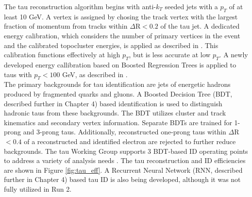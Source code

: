 The tau reconstruction algorithm begins with anti-$k_T$ seeded jets with a $p_T$ of at least 10 GeV. A vertex is assigned by chosing the track vertex with the largest fraction of momentum from tracks within $\Delta$R$<0.2$ of the tau jet. A dedicated energy calibration, which considers the number of primary vertices in the event and the calibrated topocluster energies, is applied as described in \cite{taus_run2}. This calibration functions effectively at high $p_T$, but is less accurate at low $p_T$. A newly developed energy callibration based on Boosted Regression Trees is applied to taus with $p_T<100$ GeV, as described in \cite{tau_particle_flow}.\\

The primary backgrounds for tau identification are jets of energetic hadrons produced by fragmented quarks and gluons. A Boosted Decision Tree (BDT, described further in Chapter 4) based identification is used to distinguish hadronic taus from these backgrounds. The BDT utilizes cluster and track kinematics and secondary vertex information. Separate BDTs are trained for 1-prong and 3-prong taus. Additionally, reconstructed one-prong taus within $\Delta$R$<0.4$ of a reconstructed and identified electron are rejected to further reduce backgrounds. The tau Working Group supports 3 BDT-based ID operating points to address a variety of analysis needs \cite{tau_id}. The tau reconstruction and ID efficiencies are shown in Figure \ref{fig:tau_eff}. A Recurrent Neural Network (RNN, described further in Chapter 4) based tau ID is also being developed, although it was not fully utilized in Run 2.\\

